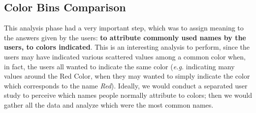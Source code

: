 \subsection{Color Bins Comparison}
\label{subsec:results_preparation}
%
This analysis phase had a very important step, which was to assign meaning to the answers given by the users: \textbf{to attribute commonly used names by the users, to colors indicated}. This is an interesting
analysis to perform, since the users may have indicated various scattered values among a common color when, in fact, the users all wanted to indicate the same color (\emph{e.g.} indicating many values around the
Red Color, when they may wanted to simply indicate the color which corresponds to the name \emph{Red}). Ideally, we would conduct a separated user study to perceive which names people normally attribute to colors;
then we would gather all the data and analyze which were the most common names. \par
%
